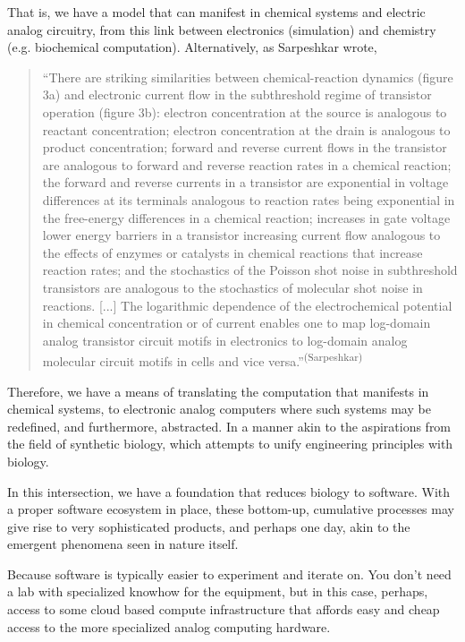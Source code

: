 That is, we have a model that can manifest in chemical systems and electric analog circuitry, from this link between electronics (simulation) and chemistry (e.g. biochemical computation). Alternatively, as Sarpeshkar wrote,
\begin{quotation}
    ``There are striking similarities between chemical-reaction dynamics (figure 3a) and electronic current flow in the subthreshold regime of transistor operation (figure 3b): electron concentration at the source is analogous to reactant concentration; electron concentration at the drain is analogous to product concentration; forward and reverse current flows in the transistor are analogous to forward and reverse reaction rates in a chemical reaction; the forward and reverse currents in a transistor are exponential in voltage differences at its terminals analogous to reaction rates being exponential in the free-energy differences in a chemical reaction; increases in gate voltage lower energy barriers in a transistor increasing current flow analogous to the effects of enzymes or catalysts in chemical reactions that increase reaction rates; and the stochastics of the Poisson shot noise in subthreshold transistors are analogous to the stochastics of molecular shot noise in reactions. [...] The logarithmic dependence of the electrochemical potential in chemical concentration or of current enables one to map log-domain analog transistor circuit motifs in electronics to log-domain analog molecular circuit motifs in cells and vice versa.''\textsuperscript{(Sarpeshkar)}
\end{quotation}

Therefore, we have a means of translating the computation that manifests in chemical systems, to electronic analog computers where such systems may be redefined, and furthermore, abstracted. In a manner akin to the aspirations from the field of synthetic biology, which attempts to unify engineering principles with biology.

In this intersection, we have a foundation that reduces biology to software. With a proper software ecosystem in place, these bottom-up, cumulative processes may give rise to very sophisticated products, and perhaps one day, akin to the emergent phenomena seen in nature itself.

Because software is typically easier to experiment and iterate on. You don't need a lab with specialized knowhow for the equipment, but in this case, perhaps, access to some cloud based compute infrastructure that affords easy and cheap access to the more specialized analog computing hardware.

